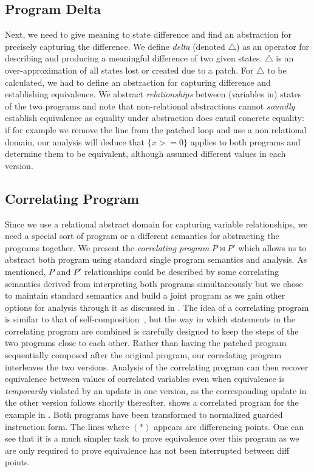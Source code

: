 \subsection{Program Delta}
Next, we need to give meaning to state difference and find an abstraction for precisely capturing the difference. We define \emph{delta} (denoted $\triangle$) as an operator for describing and producing a meaningful difference of two given states. $\triangle$ is an over-approximation of all states lost or created due to a patch. For $\triangle$ to be calculated, we had to define an abstraction for capturing difference and establishing equivalence. We abstract \emph{relationships} between (variables in) states of the two programs and note that non-relational abstractions cannot \emph{soundly} establish equivalence as equality under abstraction does entail concrete equality: if for example we remove the  line from the patched loop and use a non relational domain, our analysis will deduce that $\{x>=0\}$ applies to both programs and determine them to be equivalent, although  assumed different values in each version.

\subsection{Correlating Program}
Since we use a relational abstract domain for capturing variable relationships, we need a special sort of program or a different semantics for abstracting the programs together. We present the \emph{correlating program} $P \bowtie P'$ which allows us to abstract both program using standard single program semantics and analysis. As mentioned, $P$ and $P'$ relationships could be described by some correlating semantics derived from interpreting both programs simultaneously but we chose to maintain standard semantics and build a joint program as we gain other options for analysis through it as discussed in . The idea of a correlating program is similar to that of self-composition~\cite{BGDR:CSFW04,TA:SAS05}, but the way in which statements in the correlating program are combined is carefully designed to keep the steps of the two programs close to each other. Rather than having the patched program sequentially composed after the original program, our correlating program interleaves the two versions. Analysis of the correlating program can then recover equivalence between values of correlated variables even when equivalence is \emph{temporarily} violated by an update in one version, as the corresponding update in the other version follows shortly thereafter.  shows a correlated program for the example in . Both programs have been transformed to normalized guarded instruction form. The lines where $(*)$ appears are differencing points. One can see that it is a much simpler task to prove equivalence over this program as we are only required to prove equivalence has not been interrupted between diff points.

